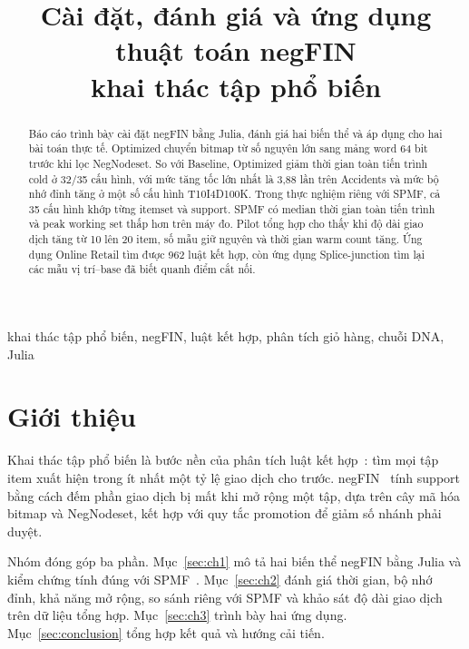 \documentclass[conference]{IEEEtran}
\begin{document}
\title{Cài đặt, đánh giá và ứng dụng thuật toán negFIN\\khai thác tập phổ biến}

\author{
}

\maketitle

\begin{abstract}
Báo cáo trình bày cài đặt negFIN bằng Julia, đánh giá hai biến thể và áp dụng cho hai bài toán thực tế. Optimized chuyển bitmap từ số nguyên lớn sang mảng word 64 bit trước khi lọc NegNodeset. So với Baseline, Optimized giảm thời gian toàn tiến trình cold ở 32/35 cấu hình, với mức tăng tốc lớn nhất là 3,88 lần trên Accidents và mức bộ nhớ đỉnh tăng ở một số cấu hình T10I4D100K. Trong thực nghiệm riêng với SPMF, cả 35 cấu hình khớp từng itemset và support. SPMF có median thời gian toàn tiến trình và peak working set thấp hơn trên máy đo. Pilot tổng hợp cho thấy khi độ dài giao dịch tăng từ 10 lên 20 item, số mẫu giữ nguyên và thời gian warm count tăng. Ứng dụng Online Retail tìm được 962 luật kết hợp, còn ứng dụng Splice-junction tìm lại các mẫu vị trí–base đã biết quanh điểm cắt nối.
\end{abstract}

\begin{IEEEkeywords}
khai thác tập phổ biến, negFIN, luật kết hợp, phân tích giỏ hàng, chuỗi DNA, Julia
\end{IEEEkeywords}

\section{Giới thiệu}
Khai thác tập phổ biến là bước nền của phân tích luật kết hợp~\cite{agrawal}: tìm mọi tập item xuất hiện trong ít nhất một tỷ lệ giao dịch cho trước. negFIN~\cite{negfin} tính support bằng cách đếm phần giao dịch bị mất khi mở rộng một tập, dựa trên cây mã hóa bitmap và NegNodeset, kết hợp với quy tắc promotion để giảm số nhánh phải duyệt.

Nhóm đóng góp ba phần. Mục~\ref{sec:ch1} mô tả hai biến thể negFIN bằng Julia và kiểm chứng tính đúng với SPMF~\cite{spmf}. Mục~\ref{sec:ch2} đánh giá thời gian, bộ nhớ đỉnh, khả năng mở rộng, so sánh riêng với SPMF và khảo sát độ dài giao dịch trên dữ liệu tổng hợp. Mục~\ref{sec:ch3} trình bày hai ứng dụng. Mục~\ref{sec:conclusion} tổng hợp kết quả và hướng cải tiến.
\end{document}
